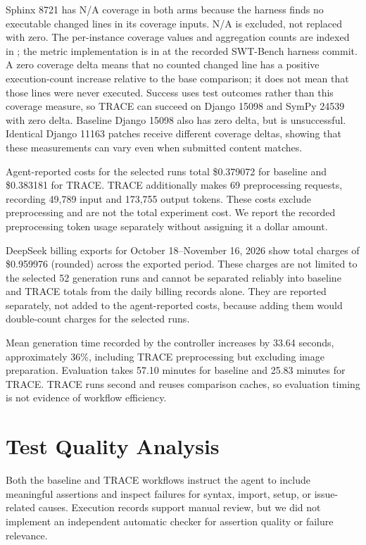 Sphinx 8721 has N/A coverage in both arms because the harness finds no executable changed lines in its coverage inputs. N/A is excluded, not replaced with zero. The per-instance coverage values and aggregation counts are indexed in ; the metric implementation is in  at the recorded SWT-Bench harness commit. A zero coverage delta means that no counted changed line has a positive execution-count increase relative to the base comparison; it does not mean that those lines were never executed. Success uses test outcomes rather than this coverage measure, so TRACE can succeed on Django 15098 and SymPy 24539 with zero delta. Baseline Django 15098 also has zero delta, but is unsuccessful. Identical Django 11163 patches receive different coverage deltas, showing that these measurements can vary even when submitted content matches.

Agent-reported costs for the selected runs total \$0.379072 for baseline and \$0.383181 for TRACE. TRACE additionally makes 69 preprocessing requests, recording 49,789 input and 173,755 output tokens. These costs exclude preprocessing and are not the total experiment cost. We report the recorded preprocessing token usage separately without assigning it a dollar amount. 

DeepSeek billing exports for October 18--November 16, 2026 show total charges of \$0.959976 (rounded) across the exported period. These charges are not limited to the selected 52 generation runs and cannot be separated reliably into baseline and TRACE totals from the daily billing records alone. They are reported separately, not added to the agent-reported costs, because adding them would double-count charges for the selected runs. 

Mean generation time recorded by the controller increases by 33.64 seconds, approximately 36\%, including TRACE preprocessing but excluding image preparation. Evaluation takes 57.10 minutes for baseline and 25.83 minutes for TRACE. TRACE runs second and reuses comparison caches, so evaluation timing is not evidence of workflow efficiency.

\section{Test Quality Analysis}\label{sec:test-quality}
Both the baseline and TRACE workflows instruct the agent to include meaningful assertions and inspect failures for syntax, import, setup, or issue-related causes. Execution records support manual review, but we did not implement an independent automatic checker for assertion quality or failure relevance.

